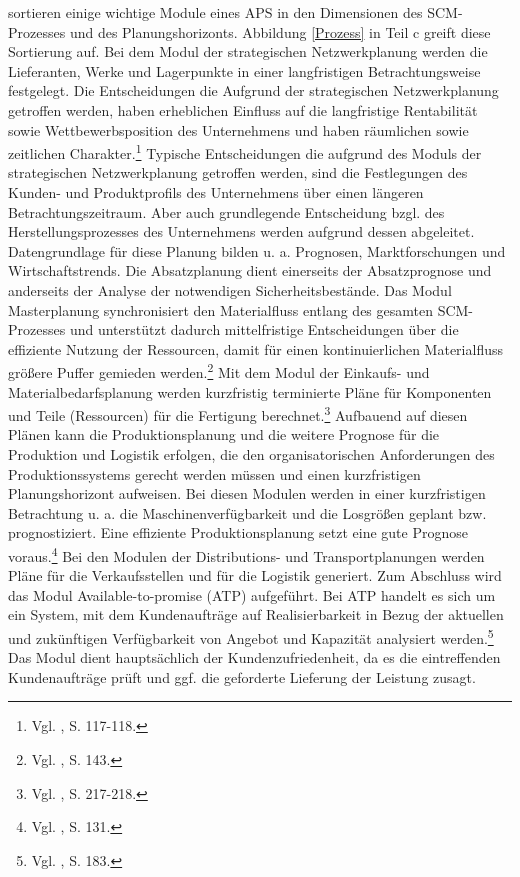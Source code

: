\cite{meyr2015structure} sortieren einige wichtige Module eines APS in den Dimensionen des SCM-Prozesses und des Planungshorizonts. Abbildung \ref{Prozess} in Teil c greift diese Sortierung auf. Bei dem Modul der strategischen Netzwerkplanung werden die Lieferanten, Werke und Lagerpunkte in einer langfristigen Betrachtungsweise festgelegt. Die Entscheidungen die Aufgrund der strategischen Netzwerkplanung getroffen werden, haben erheblichen Einfluss auf die langfristige Rentabilität sowie Wettbewerbsposition des Unternehmens und haben räumlichen sowie zeitlichen Charakter.\footnote{Vgl. \cite{goetschalckx2005strategic}, S. 117-118.} Typische Entscheidungen die aufgrund des Moduls der strategischen Netzwerkplanung getroffen werden, sind die Festlegungen des Kunden- und Produktprofils des Unternehmens über einen längeren Betrachtungszeitraum. Aber auch grundlegende Entscheidung bzgl. des Herstellungsprozesses des Unternehmens werden aufgrund dessen abgeleitet. Datengrundlage für diese Planung bilden u. a. Prognosen, Marktforschungen und Wirtschaftstrends.
Die Absatzplanung dient einerseits der Absatzprognose und anderseits der Analyse der notwendigen Sicherheitsbestände. Das Modul Masterplanung synchronisiert den Materialfluss entlang des gesamten SCM-Prozesses und unterstützt dadurch mittelfristige Entscheidungen über die effiziente Nutzung der Ressourcen, damit für einen kontinuierlichen Materialfluss größere Puffer gemieden werden.\footnote{Vgl. \cite{rohde2002scm}, S. 143.} Mit dem Modul der Einkaufs- und Materialbedarfsplanung werden kurzfristig terminierte Pläne für Komponenten und Teile (Ressourcen) für die Fertigung berechnet.\footnote{Vgl. \cite{stadler2008aps}, S. 217-218.} Aufbauend auf diesen Plänen kann die Produktionsplanung und die weitere Prognose für die Produktion und Logistik erfolgen, die den organisatorischen Anforderungen des Produktionssystems gerecht werden müssen und einen kurzfristigen Planungshorizont aufweisen. Bei diesen Modulen werden in einer kurzfristigen Betrachtung u. a. die Maschinenverfügbarkeit und die Losgrößen geplant bzw. prognostiziert. Eine effiziente Produktionsplanung setzt eine gute Prognose voraus.\footnote{Vgl. \cite{dickersback2004pp}, S. 131.} Bei den Modulen der Distributions- und Transportplanungen werden Pläne für die Verkaufsstellen und für die Logistik generiert. Zum Abschluss wird das Modul Available-to-promise (ATP) aufgeführt. Bei ATP handelt es sich um ein System, mit dem Kundenaufträge auf Realisierbarkeit in Bezug der aktuellen und zukünftigen Verfügbarkeit von Angebot und Kapazität analysiert werden.\footnote{Vgl. \cite{Stadtler:2008aa}, S. 183.} Das Modul dient hauptsächlich der Kundenzufriedenheit, da es die eintreffenden Kundenaufträge prüft und ggf. die geforderte Lieferung der Leistung zusagt.

